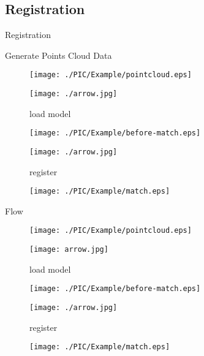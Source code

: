 \documentclass[xcolor=table,compress,blue]{beamer}
\begin{document}
\subsection{Registration}
\begin{frame}{Registration}
	\begin{exampleblock}{Generate Points Cloud Data}
		\begin{figure}[htpb]
			\centering
			\begin{minipage}[b]{0.8in}
				\centerline{ \texttt{[image: ./PIC/Example/pointcloud.eps]} }
			\end{minipage}
			\begin{minipage}[b]{0.8in}
				\centerline{ \quad}
				\centerline{ \texttt{[image: ./arrow.jpg]} }
				\centerline{\tiny{load model}}
			\end{minipage}
			\begin{minipage}[b]{0.8in}
				\centerline{ \texttt{[image: ./PIC/Example/before-match.eps]} }
			\end{minipage}
			\begin{minipage}[b]{0.8in}
				\centerline{ \texttt{[image: ./arrow.jpg]} }
				\centerline{\tiny{register}}
			\end{minipage}
			\begin{minipage}[b]{0.8in}
				\centerline{ \texttt{[image: ./PIC/Example/match.eps]} }
			\end{minipage}
		\end{figure}
	\end{exampleblock}
	\begin{exampleblock}{Flow}
		\begin{figure}[htpb]
			\centering
			\begin{minipage}[b]{0.8in}
				\centerline{ \texttt{[image: ./PIC/Example/pointcloud.eps]} }
			\end{minipage}
			\begin{minipage}[b]{0.8in}
				\centerline{ \quad}
				\centerline{ \texttt{[image: arrow.jpg]} }
				\centerline{\tiny{load model}}
			\end{minipage}
			\begin{minipage}[b]{0.8in}
				\centerline{ \texttt{[image: ./PIC/Example/before-match.eps]} }
			\end{minipage}
			\begin{minipage}[b]{0.8in}
				\centerline{ \texttt{[image: ./arrow.jpg]} }
				\centerline{\tiny{register}}
			\end{minipage}
			\begin{minipage}[b]{0.8in}
				\centerline{ \texttt{[image: ./PIC/Example/match.eps]} }
			\end{minipage}
		\end{figure}
	\end{exampleblock}
\end{frame}
\end{document}

